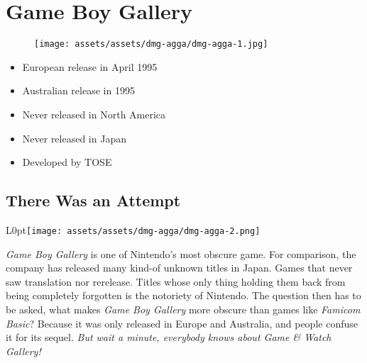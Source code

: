 \documentclass{book}
\begin{document}
\chapter*{Game Boy Gallery}
\vspace{\baselineskip}\begin{figure}[H]{\texttt{[image: assets/assets/dmg-agga/dmg-agga-1.jpg]}}\end{figure}\vspace{\baselineskip}
\begin{itemize}[left=0pt, nosep]
\item European release in April 1995
\item Australian release in 1995
\item Never released in North America
\item Never released in Japan
\item Developed by TOSE

\end{itemize}
\newpage\FloatBarrier\section*{There Was an Attempt}
\begin{wrapfigure}{L}{0pt}{\texttt{[image: assets/assets/dmg-agga/dmg-agga-2.png]}}\end{wrapfigure}\noindent
\emph{Game Boy Gallery} is one of Nintendo’s most obscure game. For comparison, the company has released many kind-of unknown titles in Japan. Games that never saw translation nor rerelease. Titles whose only thing holding them back from being completely forgotten is the notoriety of Nintendo. The question then has to be asked, what makes \emph{Game Boy Gallery} more obscure than games like \emph{Famicom Basic}? Because it was only released in Europe and Australia, and people confuse it for its sequel. \emph{But wait a minute, everybody knows about Game \& Watch Gallery!}\par
\FloatBarrier\vspace{\baselineskip}\centering
\begin{minipage}{0.45\linewidth}\captionsetup{labelformat=empty}\end{minipage}\vspace{2pt}
\begin{minipage}{0.45\linewidth}\captionsetup{labelformat=empty}\end{minipage}
\end{document}
